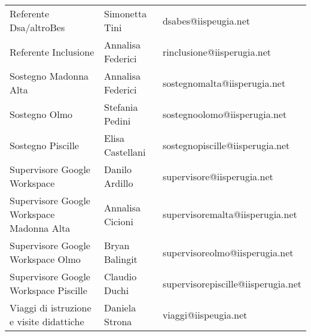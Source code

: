 \begin{center}
\begin{tabular}{lll}
	Referente Dsa/altroBes&
	Simonetta Tini&
	dsabes@iispeugia.net\\
	Referente Inclusione&
	Annalisa Federici&
	rinclusione@iisperugia.net\\
	Sostegno Madonna Alta&
	Annalisa Federici&
	sostegnomalta@iisperugia.net\\
	Sostegno Olmo&
	Stefania Pedini&
	sostegnoolomo@iisperugia.net\\
	Sostegno Piscille&
	Elisa Castellani&
	sostegnopiscille@iisperugia.net\\
	Supervisore Google Workspace &
	Danilo Ardillo&
	supervisore@iisperugia.net\\
	Supervisore Google Workspace Madonna Alta&
	Annalisa Cicioni&
	supervisoremalta@iisperugia.net\\
	Supervisore Google Workspace Olmo&
	Bryan Balingit&
	supervisoreolmo@iisperugia.net\\
	Supervisore Google Workspace Piscille&
	Claudio Duchi&
	supervisorepiscille@iisperugia.net\\
	Viaggi di istruzione e visite didattiche&
	Daniela Strona&
	viaggi@iispeugia.net\\
	\bottomrule
\end{tabular}
\end{center}
